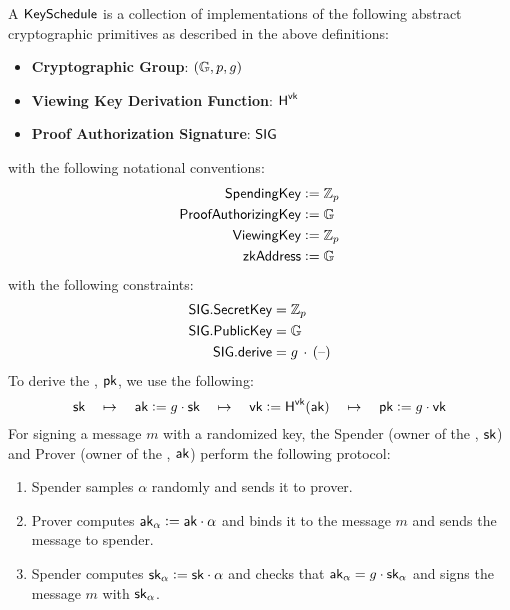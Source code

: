 \begin{definition}
    A ${\textsf{KeySchedule}}$ is a collection of implementations of the following abstract cryptographic primitives as described in the above definitions:
    \begin{itemize}
        \item \textbf{Cryptographic Group}: $({\mathbb{G}}, p, g)$
        \item \textbf{Viewing Key Derivation Function}: ${\textsf{H}}^{\textsf{vk}}$
        \item \textbf{Proof Authorization Signature}: ${\textsf{SIG}}$
    \end{itemize}
    with the following notational conventions:
    \begin{align*}
        {\textsf{SpendingKey}}         &:= {\mathbb{Z}}_p \\
        {\textsf{ProofAuthorizingKey}} &:= {\mathbb{G}} \\
        {\textsf{ViewingKey}}          &:= {\mathbb{Z}}_p \\
        {\textsf{zkAddress}}           &:= {\mathbb{G}}
    \end{align*}
    with the following constraints:
    \begin{align*}
        {\textsf{SIG}}.{\textsf{SecretKey}} &= {\mathbb{Z}}_p \\
        {\textsf{SIG}}.{\textsf{PublicKey}} &= {\mathbb{G}} \\
        {\textsf{SIG}}.{\textsf{derive}}    &= g\,\cdot\,({\textrm{--}})
    \end{align*}
    To derive the \zkAddress{}, ${\textsf{pk}}$, we use the following:
    \[{\textsf{sk}} \quad\mapsto\quad {\textsf{ak}} := g \cdot {\textsf{sk}} \quad\mapsto\quad {\textsf{vk}} := {\textsf{H}}^{\textsf{vk}}({\textsf{ak}}) \quad\mapsto\quad {\textsf{pk}} := g \cdot {\textsf{vk}}\]
    For signing a message $m$ with a randomized key, the Spender (owner of the \SpendingKey{}, ${\textsf{sk}}$) and Prover (owner of the \ProofAuthorizingKey{}, ${\textsf{ak}}$) perform the following protocol:
    \begin{enumerate}
        \item Spender samples $\alpha$ randomly and sends it to prover.
        \item Prover computes ${\textsf{ak}}_\alpha := {\textsf{ak}} \cdot \alpha$ and binds it to the message $m$ and sends the message to spender.
        \item Spender computes ${\textsf{sk}}_\alpha := {\textsf{sk}} \cdot \alpha$ and checks that ${\textsf{ak}}_\alpha = g \cdot {\textsf{sk}}_\alpha$ and signs the message $m$ with ${\textsf{sk}}_\alpha$.
    \end{enumerate}
\end{definition}


